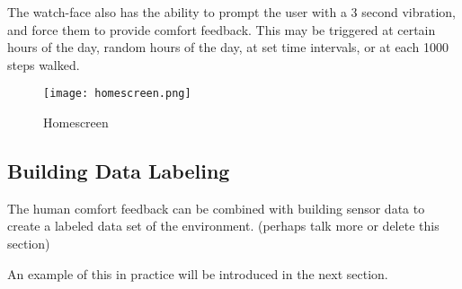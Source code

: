 The watch-face also has the ability to prompt the user with a 3 second vibration, and force them to provide comfort feedback. This may be triggered at certain hours of the day, random hours of the day, at set time intervals, or at each 1000 steps walked. 


\begin{figure}
\begin{center}
\texttt{[image: homescreen.png]}
\caption{Homescreen}
\label{fig:homescreen}
\end{center}
\end{figure}

\subsection{Building Data Labeling}

The human comfort feedback can be combined with building sensor data to create a labeled data set of the environment. (perhaps talk more or delete this section)

An example of this in practice will be introduced in the next section.
